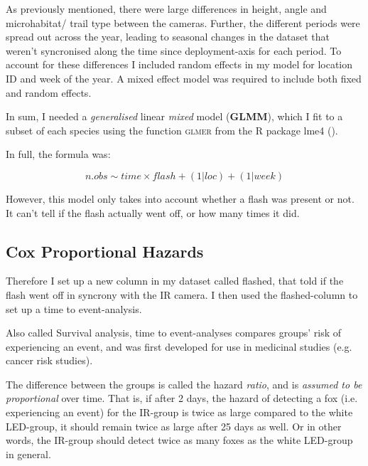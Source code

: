 As previously mentioned, there were large differences in height, angle and microhabitat/ trail type between the cameras. Further, the different periods were spread out across the year, leading to seasonal changes in the dataset that weren't syncronised along the time since deployment-axis for each period.
To account for these differences I included random effects in my model for location ID and week of the year.
A mixed effect model was required to include both fixed and random effects.

In sum, I needed a \emph{generalised} linear \emph{mixed} model (\textbf{GLMM}), which I fit to a subset of each species using the function \textsc{glmer} from the R package lme4 (\cite{lme4}).

In full, the formula was:

$$n.obs \sim time \times flash + (1|loc) + (1|week) $$


However, this model only takes into account whether a flash was present or not. It can't tell if the flash actually went off, or how many times it did.

	\subsection*{Cox Proportional Hazards}

Therefore I set up a new column in my dataset called flashed, that told if the flash went off in syncrony with the IR camera.
I then used the flashed-column to set up a time to event-analysis.

Also called Survival analysis, time to event-analyses compares groups' risk of experiencing an event, and was first developed for use in medicinal studies (e.g. cancer risk studies).

The difference between the groups is called the hazard \emph{ratio}, and is \emph{assumed to be proportional} over time. That is, if after 2 days, the hazard of detecting a fox (i.e. experiencing an event) for the IR-group is twice as large compared to the white LED-group, it should remain twice as large after 25 days as well. Or in other words, the IR-group should detect twice as many foxes as the white LED-group in general.


